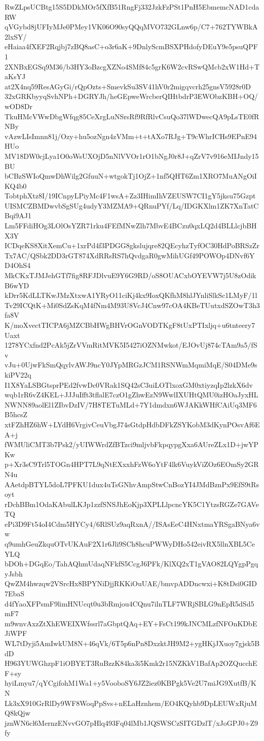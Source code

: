 RwZLpsUCBtg15S5DDkMOr5fXfB51RngFj332JzkFzPSt1PnH5EbmemcNAD1cdaRW
qVGybd8jUFIyMJe0PMey1VK06O90syQQqMVO732GLnw6p/C7+762TYWBkA2lxSY/
eHaiaa4fXEF2Rqjbj7zBQ8asC+o3r6aK+9DnlyScmBSXPHdofyDEuY9e5psuQPF1
2XNBxEGSq9M36/b3HY3oBzcgXZNo4SMf84c5grK6W2cvRSwQMcb2xW1Hd+TaKsYJ
at2X4nq59ResAGyGi/rQpOzts+SmevkSu3SV41hV0r2migqvcrh25gnsV5928r0D
32xGRKbyyqSvhNPh+DGRYJh/heGEpweWrcberQIHtbdrP3EWObzKBH+OQ/wOD8Dr
TkuHMcVWwDbgWfqg85CeXrgLuNSrsRf9RfRlvCsuQo37lWDwecQA9pLsTE0fRNBy
vAzwLIsImnn81j/Ozy+hu5ozNgn4zVMm+t+tAXo7RJg+T9cWhrICHs9EPnE94HUo
MV18DW0cjLya1O0oWsUXOjD5nNlVVOr1rO1bNgJ0r8J+qZrV7v916eMIJndy15BU
bCBzSWIoQmwDhWilg2GfuuN+wtgokTj1OjZ+1nf5QHT6Zm1XRO7MuANgOiIKQ4b0
TobtphXtz8I/19ICnpyLPiyMc4F1wsA+Zz3IHimIhVZEUSW7CI1gY5jksu75Gzpt
UISMCZBMDwvbSgSUg4udyY3MZMA9+QRnuPYf/Lq/IDGKXlm1ZK7XnTatCBqi9AJ1
Lm5FFdiHOg3LOlOsYZR71rku4FEfMNwZlh7MbvE4BCzu0qxLQ2d4BLLlcjbBHX3Y
ICDqeKS8XitXemCu+1xrPd4f3PDGG8gkslujqre82QEcyhzTyfOC30HdPoBRSzZr
Tx7AC/QSbk2DD3rGT874XdRRsRS7hQvdgaR0gwMihUGf49POWOp4DNvf6YD4OhS4
MkCKxTJMJehGTf7fig8RFJDlvuE9Y6G9RD/oS8OUACxbOYEVW7j5U8zOdikB6wYD
kDrr5KdLLTKwJMzXtxwA1YRyO11ciKj4kx9IoxQKfhM8hlJYnliSlkSc1LMyF/1l
Tv29ICQtK+Mi0SdZsKqM4fNm4M93U8VcJ4Cnw97cOA4KBeTUutxdSZOwT3h3fa8V
K/moXvectTICPA6jMZCBbHWgBHVrOGnVODTKgF8tUxPTIxljq+u6tnteery7Uaxt
1278YCxfnd2PcAk5jZrVVmRitMVK5I5427iOZNMwkot/EJOvUj874cTAm9a5/fSv
vJu+0UjwFkSmQqylvAWJ9ncY0JYpMRGzJCM1RSNWmMqmiMqE/S04DMe9skiPV22q
I1X8YaLSBGtsprPEd2fvwDc0VRak1SQ42sC3uiLOTlxoxGM0xtiyzqIp2lzkX6dv
wqb1rR6vZ4KEL+JJJuIfft3tflalE7czO1gZhwEzN9WwlIXUHtQMU0izHOaJyxHL
NWNN89aolEl1ZIbvDzIV/7H8TETuMLd+7Y1dmdxn6WJAKkWHfCAiUq3MF6B5hcsZ
xtFZhHZ6hW+LYdH6VrgivCeuVbgJ74sGtdpHdbDFkZSYKobM3dKynPOsvAf6EA+j
fWMUliCMT3b7Psk2/yUIWWrdZfBTzci9mljvbFkpqypgXxa6AUreZLx1D+jwYPKw
p+Xr3sC9Trl5TOGn4HPT7L9qNtEXxxhFzW6oYtF4lk6VuykViZOz6EOmSy2GRN4u
AAetdpBTYL5doL7PFKU1dux4uTsGNhvAmpStwCnBozYI4JMdBznPx9EfS9tRsoyt
rDchBBm1OdaKAbulLKJp1zzfSNSJhEoKjp3XPLLlpcncYK5C1YtzsRGZe7GAVeTQ
ePi3D9Ft54oI4Cdm5HYCy4/6RlSUz9aqRxnA//ISAsEeC4HNxtmaYRSgaBNya6vw
q9umhGeuZkquOTvUKAuF2X1r6Jli9SCh8hcuPWWyDHo542eivRX5llnXBL5CeYLQ
bDOh+DGqEo/TahAQhmUdaqNFkfS5CcgJ6PFk/KlXQ2xT1gVAO82LQYgpPgqyJsbh
QwZM4hwzqw2VSrcHx8BPYNiDjjRKKiOuUAE/bmvpADDncwxi+K8tDsi0GID7EbaS
d4fYaoXFPsmF9limHNUcqt0u3bRmjou4CQnu7ilnTLF7WRjSBLG9nEpR5dSd5mF7
m9wnvAxzZtXhEWEIXWfssrl7aGbptQAq+EY+FsCt199kJNCMLzfNFOnKDbEJiWPF
WL7tDyji5AmIwkUM8N+46qVk/6T5p6nPn8DxzktJH9M2+ygHKjJXuoy7gjsk5BdD
H963YUWGhzpF1iOBYET3RuBzzK84ka3i5Kmk2r15NZKkV1BafAp2OZQucchEF+sy
hyiLmyu7/qYCgifohM1Wa1+y5VooboSY6JZ2iez0KBPgk5Ve2U7miJG9XutfB/KN
Lk3xX910GrRlDy9WF8WoqPpSvs+nELaHznhem/EO4KQyhb9DpLEUWxRjuMQ8kQjw
jznWN6cl6MernzENvvGO7pHlq493Fq04lMb1JQSWSCzSITGDzlT/xJoGPJ0+Z9fy

